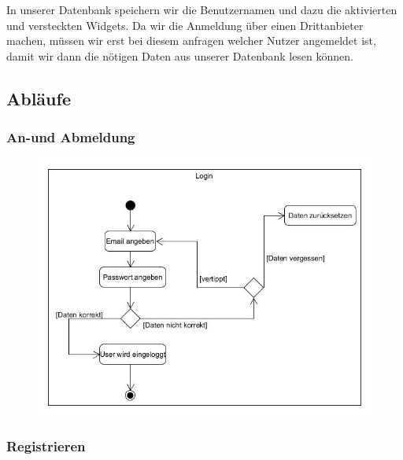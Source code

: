 	In unserer Datenbank speichern wir die Benutzernamen und dazu die aktivierten und versteckten Widgets.
	Da wir die Anmeldung über einen Drittanbieter machen, müssen wir erst bei diesem anfragen welcher Nutzer
	angemeldet ist, damit wir dann die nötigen Daten aus unserer Datenbank lesen können.
	
	\subsection{Abläufe}
	
		\subsubsection{An-und Abmeldung}
		
			\begin{figure}[H]
				\includegraphics[scale=0.6]{images/UC1Activity}
			\end{figure}
		
		\subsubsection{Registrieren}
		
